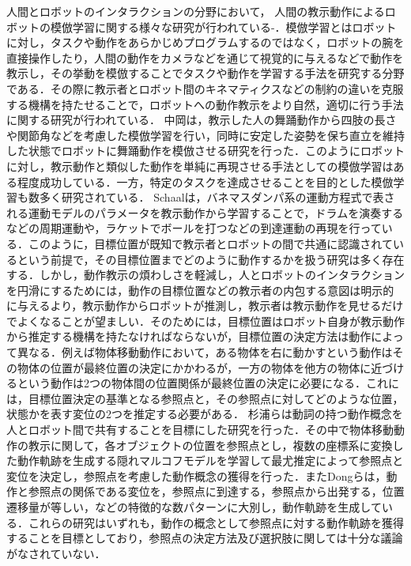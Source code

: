 人間とロボットのインタラクションの分野において，
人間の教示動作によるロボットの模倣学習に関する様々な研究が行われている\cite{imitation1}-\cite{imitation4}．模倣学習とはロボットに対し，タスクや動作をあらかじめプログラムするのではなく，ロボットの腕を直接操作したり，人間の動作をカメラなどを通じて視覚的に与えるなどで動作を教示し，その挙動を模倣することでタスクや動作を学習する手法を研究する分野である．その際に教示者とロボット間のキネマティクスなどの制約の違いを克服する機構を持たせることで，ロボットへの動作教示をより自然，適切に行う手法に関する研究が行われている．
中岡\cite{nakaoka}は，教示した人の舞踊動作から四肢の長さや関節角などを考慮した模倣学習を行い，同時に安定した姿勢を保ち直立を維持した状態でロボットに舞踊動作を模倣させる研究を行った．このようにロボットに対し，教示動作と類似した動作を単純に再現させる手法としての模倣学習はある程度成功している．一方，特定のタスクを達成させることを目的とした模倣学習も数多く研究されている．
Schaal\cite{schaal}は，バネマスダンパ系の運動方程式で表される運動モデルのパラメータを教示動作から学習することで，ドラムを演奏するなどの周期運動や，ラケットでボールを打つなどの到達運動の再現を行っている．このように，目標位置が既知で教示者とロボットの間で共通に認識されているという前提で，その目標位置までどのように動作するかを扱う研究は多く存在する．しかし，動作教示の煩わしさを軽減し，人とロボットのインタラクションを円滑にするためには，動作の目標位置などの教示者の内包する意図は明示的に与えるより，教示動作からロボットが推測し，教示者は教示動作を見せるだけでよくなることが望ましい．そのためには，目標位置はロボット自身が教示動作から推定する機構を持たなければならないが，目標位置の決定方法は動作によって異なる．例えば物体移動動作において，ある物体を右に動かすという動作はその物体の位置が最終位置の決定にかかわるが，一方の物体を他方の物体に近づけるという動作は2つの物体間の位置関係が最終位置の決定に必要になる．これには，目標位置決定の基準となる参照点と，その参照点に対してどのような位置，状態かを表す変位の2つを推定する必要がある．
杉浦ら\cite{sugiura}は動詞の持つ動作概念を人とロボット間で共有することを目標にした研究を行った．その中で物体移動動作の教示に関して，各オブジェクトの位置を参照点とし，複数の座標系に変換した動作軌跡を生成する隠れマルコフモデルを学習して最尤推定によって参照点と変位を決定し，参照点を考慮した動作概念の獲得を行った．またDongら\cite{dong}は，動作と参照点の関係である変位を，参照点に到達する，参照点から出発する，位置遷移量が等しい，などの特徴的な数パターンに大別し，動作軌跡を生成している．これらの研究はいずれも，動作の概念として参照点に対する動作軌跡を獲得することを目標としており，参照点の決定方法及び選択肢に関しては十分な議論がなされていない．
